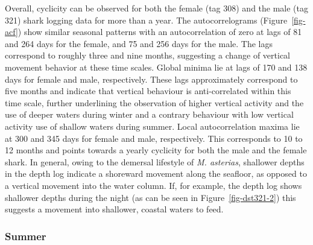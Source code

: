 \documentclass[
  authoryear,
  review,
  3p]{elsarticle}
\begin{document}
Overall, cyclicity can be observed for both the female (tag 308) and the
male (tag 321) shark logging data for more than a year. The
autocorrelograms (Figure~\ref{fig-acf}) show similar seasonal patterns
with an autocorrelation of zero at lags of 81 and 264 days for the
female, and 75 and 256 days for the male. The lags correspond to roughly
three and nine months, suggesting a change of vertical movement behavior
at these time scales. Global minima lie at lags of 170 and 138 days for
female and male, respectively. These lags approximately correspond to
five months and indicate that vertical behaviour is anti-correlated
within this time scale, further underlining the observation of higher
vertical activity and the use of deeper waters during winter and a
contrary behaviour with low vertical activity use of shallow waters
during summer. Local autocorrelation maxima lie at 300 and 345 days for
female and male, respectively. This corresponds to 10 to 12 months and
points towards a yearly cyclicity for both the male and the female
shark. In general, owing to the demersal lifestyle of \emph{M.
asterias}, shallower depths in the depth log indicate a shoreward
movement along the seafloor, as opposed to a vertical movement into the
water column. If, for example, the depth log shows shallower depths
during the night (as can be seen in Figure~\ref{fig-dst321-2}) this
suggests a movement into shallower, coastal waters to feed.

\hypertarget{sec-disc-summer}{%
\subsubsection{Summer}\label{sec-disc-summer}}
\end{document}
